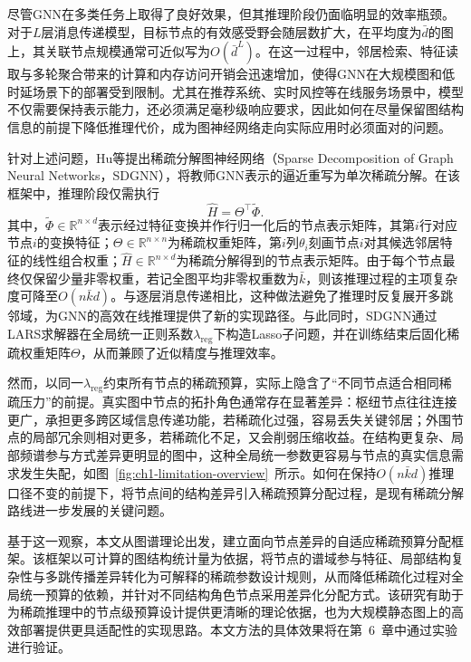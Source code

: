 尽管GNN在多类任务上取得了良好效果，但其推理阶段仍面临明显的效率瓶颈。对于$L$层消息传递模型，目标节点的有效感受野会随层数扩大，在平均度为$\bar{d}$的图上，其关联节点规模通常可近似写为$O(\bar{d}^{L})$。在这一过程中，邻居检索、特征读取与多轮聚合带来的计算和内存访问开销会迅速增加，使得GNN在大规模图和低时延场景下的部署受到限制。尤其在推荐系统、实时风控等在线服务场景中，模型不仅需要保持表示能力，还必须满足毫秒级响应要求，因此如何在尽量保留图结构信息的前提下降低推理代价，成为图神经网络走向实际应用时必须面对的问题。

针对上述问题，Hu等提出稀疏分解图神经网络（Sparse Decomposition of Graph Neural Networks，SDGNN\label{idx:name:sdgnn}）\cite{Hu2024SDGNN}，将教师GNN表示的逼近重写为单次稀疏分解\label{idx:theme:sparsedecomp}。在该框架中，推理阶段仅需执行
\begin{equation}
  \hat{H}=\Theta^\top\tilde{\Phi}.
\end{equation}
其中，$\tilde{\Phi}\in\mathbb{R}^{n\times d}$表示经过特征变换并作行归一化后的节点表示矩阵，其第$i$行对应节点$i$的变换特征；$\Theta\in\mathbb{R}^{n\times n}$为稀疏权重矩阵，第$i$列$\theta_i$刻画节点$i$对其候选邻居特征的线性组合权重；$\hat{H}\in\mathbb{R}^{n\times d}$为稀疏分解得到的节点表示矩阵。由于每个节点最终仅保留少量非零权重，若记全图平均非零权重数为$\bar{k}$，则该推理过程的主项复杂度可降至$O(n\bar{k}d)$。与逐层消息传递相比，这种做法避免了推理时反复展开多跳邻域，为GNN的高效在线推理提供了新的实现路径。与此同时，SDGNN通过LARS求解器在全局统一正则系数$\lambda_{\mathrm{reg}}$下构造Lasso子问题，并在训练结束后固化稀疏权重矩阵$\Theta$，从而兼顾了近似精度与推理效率。

然而，以同一$\lambda_{\mathrm{reg}}$约束所有节点的稀疏预算\label{idx:theme:sparsebud}，实际上隐含了“不同节点适合相同稀疏压力”的前提。真实图中节点的拓扑角色通常存在显著差异\label{idx:theme:tophete}：枢纽节点往往连接更广，承担更多跨区域信息传递功能，若稀疏化过强，容易丢失关键邻居；外围节点的局部冗余则相对更多，若稀疏化不足，又会削弱压缩收益。在结构更复杂、局部频谱参与方式差异更明显的图中，这种全局统一参数更容易与节点的真实信息需求发生失配，如图~\ref{fig:ch1-limitation-overview}~所示。如何在保持$O(n\bar{k}d)$推理口径不变的前提下，将节点间的结构差异引入稀疏预算分配过程，是现有稀疏分解路线进一步发展的关键问题。

基于这一观察，本文从图谱理论出发，建立面向节点差异的自适应稀疏预算分配框架。该框架以可计算的图结构统计量为依据，将节点的谱域参与特征、局部结构复杂性与多跳传播差异转化为可解释的稀疏参数设计规则，从而降低稀疏化过程对全局统一预算的依赖，并针对不同结构角色节点采用差异化分配方式。该研究有助于为稀疏推理中的节点级预算设计提供更清晰的理论依据，也为大规模静态图上的高效部署提供更具适配性的实现思路。本文方法的具体效果将在第~6~章中通过实验进行验证。

